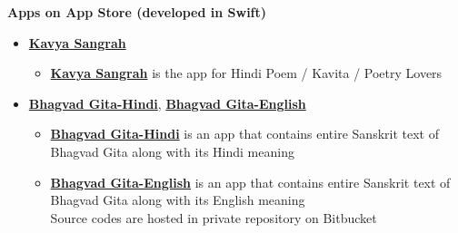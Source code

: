 \documentclass[letterpaper,11pt]{article}
\newcommand{\resitem}[1]{\item #1 \vspace{-2pt}}
\newcommand{\resheading}[1]{{\large \colorbox{mygrey}{\begin{minipage}{\textwidth}{\textbf{#1 \vphantom{p\^{E}}}}\end{minipage}}}}
\begin{document}
\resheading{Apps on App Store  \normalsize \bfseries (developed in Swift)}
	\begin{itemize}
	\resitem {\href{https://itunes.apple.com/app/id1091530315} {\bfseries Kavya Sangrah}}
				{ \footnotesize
				\begin{itemize}
					\resitem{\href{https://itunes.apple.com/app/id1091530315}{\bfseries Kavya Sangrah} is the app for Hindi Poem / Kavita / Poetry Lovers}
				\end{itemize}
				}
	\resitem {{\href{https://itunes.apple.com/app/id1099563171}{\bfseries Bhagvad Gita-Hindi}, \href{https://itunes.apple.com/app/id1099564538}{\bfseries Bhagvad Gita-English}}}
				{ \footnotesize
				\begin{itemize}
					\resitem{\href{https://itunes.apple.com/app/id1099563171}{\bfseries Bhagvad Gita-Hindi} is an app that contains entire Sanskrit text of Bhagvad Gita along with its Hindi meaning}
					\resitem{\href{https://itunes.apple.com/app/id1099564538}{\bfseries Bhagvad Gita-English} is an app that contains entire Sanskrit text of Bhagvad Gita along with its English meaning}\\
					{\tiny *Source codes are hosted in private repository on Bitbucket}
				\end{itemize}
				}
\end{itemize} 
\end{document}
